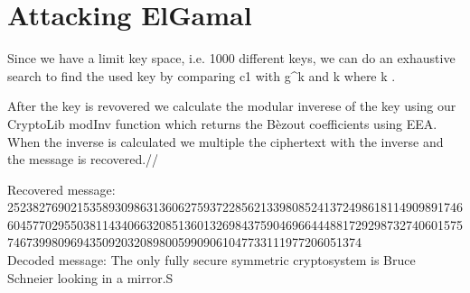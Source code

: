 \documentclass{article}
\begin{document}
\section{Attacking ElGamal}
Since we have a limit key space, i.e. 1000 different keys,  we can do an exhaustive search to find the used key by comparing c1 with g^k and k where k .

After the key is revovered we calculate the modular inverese of the key using our CryptoLib modInv function which returns the Bèzout coefficients using EEA.
When the inverse is calculated we multiple the ciphertext with the inverse and the message is recovered.//

Recovered message: 25238276902153589309863136062759372285621339808524137249861811490989174660457702955038114340663208513601326984375904696644488172929873274060157574673998096943509203208980059909061047733111977206051374 \\
Decoded message: The only fully secure symmetric cryptosystem is Bruce Schneier looking in a mirror.S       
\end{document}
